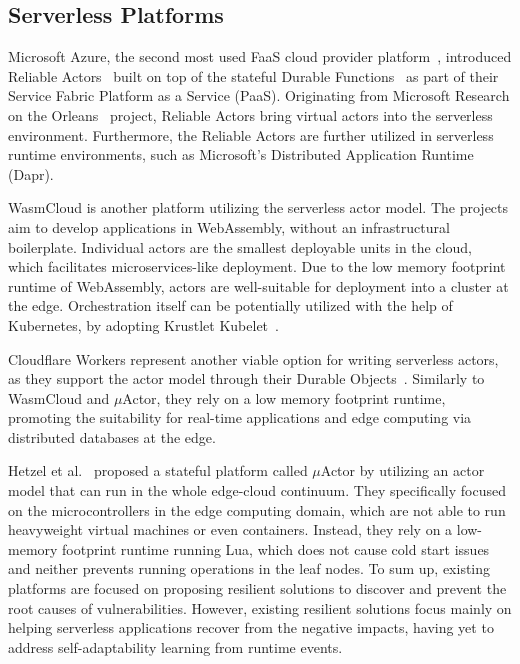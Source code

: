 \documentclass[conference]{IEEEtran}
\begin{document}
\subsection{Serverless Platforms}

Microsoft Azure, the second most used FaaS cloud provider platform~\cite{noauthor_stack_nodate}, introduced Reliable Actors~\cite{tomvcassidy_service_nodate} built on top of the stateful Durable Functions~\cite{burckhardt_durable_2021} as part of their Service Fabric Platform as a Service (PaaS). Originating from Microsoft Research on the Orleans~\cite{bernstein_orleans_nodate} project, Reliable Actors bring virtual actors into the serverless environment. %
Furthermore, the Reliable Actors are further utilized in serverless runtime environments, such as Microsoft's Distributed Application Runtime (Dapr).


WasmCloud is another platform utilizing the serverless actor model. The projects aim to develop applications in WebAssembly, without an infrastructural boilerplate. Individual actors are the smallest deployable units in the cloud, which facilitates microservices-like deployment. Due to the low memory footprint runtime of WebAssembly, actors are well-suitable for deployment into a cluster at the edge. Orchestration itself can be potentially utilized with the help of Kubernetes, by adopting Krustlet Kubelet~\cite{rac_at_2021}.

Cloudflare Workers represent another viable option for writing serverless actors, as they support the actor model through their Durable Objects~\cite{varda_workers_2020}. Similarly to WasmCloud and $\mu$Actor, they rely on a low memory footprint runtime, promoting the suitability for real-time applications and edge computing via distributed databases at the edge.

Hetzel et al.~\cite{hetzel_actor_2021} proposed a stateful platform called $\mu$Actor by utilizing an actor model that can run in the whole edge-cloud continuum. They specifically focused on the microcontrollers in the edge computing domain, which are not able to run heavyweight virtual machines or even containers. Instead, they rely on a low-memory footprint runtime running Lua, which does not cause cold start issues and neither prevents running operations in the leaf nodes. 
To sum up, existing platforms are focused on proposing resilient solutions to discover and prevent the root causes of vulnerabilities. However, existing resilient solutions focus mainly on helping serverless applications recover from the negative impacts, having yet to address self-adaptability learning from runtime events.
\end{document}
